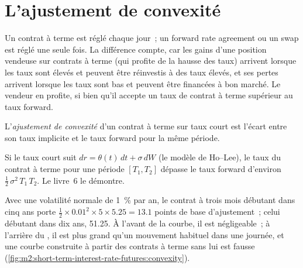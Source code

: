 \section{L'ajustement de convexité}\label{sec:m2:short-term-interest-rate-futures:convexity}

Un contrat à terme est réglé chaque jour~; un forward rate agreement ou un swap est réglé
une seule fois. La différence compte, car les gains d'une position vendeuse sur contrats à terme
(qui profite de la hausse des taux) arrivent lorsque les taux sont élevés et peuvent être réinvestis
à des taux élevés, et ses pertes arrivent lorsque les taux sont bas et peuvent être financées
à bon marché. Le vendeur en profite, si bien qu'il accepte un taux de contrat à terme
supérieur au taux forward.

\begin{definition}\label{def:m2:short-term-interest-rate-futures:convexity}
L'\emph{ajustement de convexité} d'un contrat à terme sur taux court
est l'écart entre son taux implicite et le taux forward pour
la même période.
\end{definition}

\begin{proposition}\label{prop:m2:short-term-interest-rate-futures:holee}
Si le taux court suit $dr = \theta(t)\,dt + \sigma\,dW$ (le modèle de Ho--Lee),
le taux du contrat à terme pour une période $[T_1, T_2]$ dépasse le taux forward d'environ
$\tfrac12\,\sigma^2\,T_1\,T_2$. Le livre~6 le démontre.
\end{proposition}
\admitted

\begin{example}\label{ex:m2:short-term-interest-rate-futures:convexity}
Avec une volatilité normale de 1~\% par an, le contrat à trois mois débutant dans cinq ans
porte $\frac12 \times 0.01^2 \times 5 \times 5.25 = 13.1$ points de base
d'ajustement~; celui débutant dans dix ans, 51.25. À l'avant de la courbe, il est négligeable~;
à l'arrière du , il est plus grand qu'un mouvement habituel dans une journée, et une
courbe construite à partir des contrats à terme sans lui est fausse
(\cref{fig:m2:short-term-interest-rate-futures:convexity}).
\end{example}


